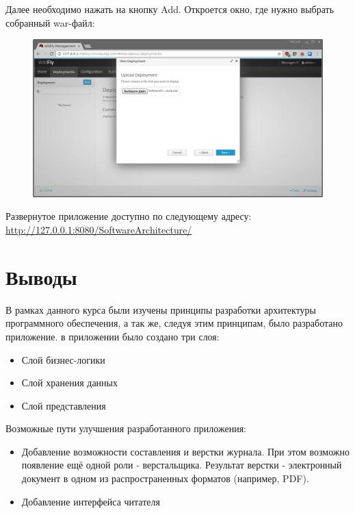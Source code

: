 Далее необходимо нажать на кнопку Add. Откроется окно, где нужно выбрать собранный war-файл:

\begin{figure}[H]
\centering
\includegraphics[width=\textwidth]{wildfly3.png}
\caption{}
\end{figure}

Развернутое приложение доступно по следующему адресу: \\ \url{http://127.0.0.1:8080/SoftwareArchitecture/}

\section{Выводы}
В рамках данного курса были изучены принципы разработки архитектуры программного обеспечения, а так же, следуя этим принципам, было разработано приложение.
в приложении было создано три слоя:

\begin{itemize}
\item
  Слой бизнес-логики
\item
  Слой хранения данных
\item
  Слой представления
\end{itemize}

Возможные пути улучшения разработанного приложения:

\begin{itemize}
\item Добавление возможности составления и верстки журнала. При этом возможно появление ещё одной роли - верстальщика. Результат верстки - электронный документ в одном из распространенных форматов (например, PDF).
\item Добавление интерфейса читателя
\end{itemize}